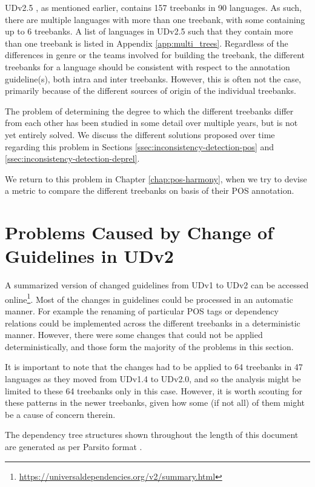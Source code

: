 UDv2.5 \citep{UDv2.5}, as mentioned earlier, contains 157 treebanks in 90 languages. As such, there are multiple languages with more than one treebank, with some containing up to 6 treebanks. A list of languages in UDv2.5 such that they contain more than one treebank is listed in Appendix \ref{app:multi_trees}. Regardless of the differences in genre or the teams involved for building the treebank, the different treebanks for a language should be consistent with respect to the annotation guideline(s), both intra and inter treebanks. However, this is often not the case, primarily because of the different sources of origin of the individual treebanks.

The problem of determining the degree to which the different treebanks differ from each other has been studied in some detail over multiple years, but is not yet entirely solved. We discuss the different solutions proposed over time regarding this problem in Sections \ref{ssec:inconsistency-detection-pos} and \ref{ssec:inconsistency-detection-deprel}.

We return to this problem in Chapter \ref{chap:pos-harmony}, when we try to devise a metric to compare the different treebanks on basis of their POS annotation.

\section{Problems Caused by Change of Guidelines in UDv2}
\label{ssec:guidelines}

A summarized version of changed guidelines from UDv1 to UDv2 can be accessed online\footnote{\url{https://universaldependencies.org/v2/summary.html}}. Most of the changes in guidelines could be processed in an automatic manner. For example the renaming of particular POS tags or dependency relations could be implemented across the different treebanks in a deterministic manner. However, there were some changes that could not be applied deterministically, and those form the majority of the problems in this section.

It is important to note that the changes had to be applied to 64 treebanks in 47 languages as they moved from UDv1.4 to UDv2.0, and so the analysis might be limited to these 64 treebanks only in this case. However, it is worth scouting for these patterns in the newer treebanks, given how some (if not all) of them might be a cause of concern therein.

The dependency tree structures shown throughout the length of this document are generated as per Parsito format \citep{Parsito}.

